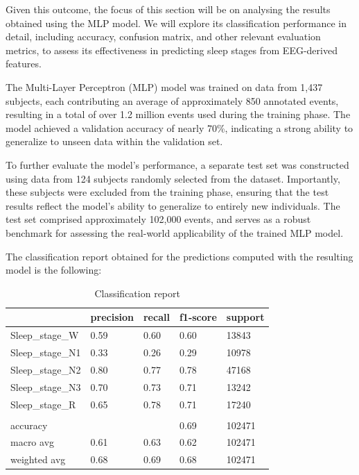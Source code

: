 Given this outcome, the focus of this section will be on analysing the results obtained using the MLP model. We will explore its classification performance in detail, including accuracy, confusion matrix, and other relevant evaluation metrics, to assess its effectiveness in predicting sleep stages from EEG-derived features.

The Multi-Layer Perceptron (MLP) model was trained on data from 1,437 subjects, each contributing an average of approximately 850 annotated events, resulting in a total of over 1.2 million events used during the training phase. The model achieved a validation accuracy of nearly 70\%, indicating a strong ability to generalize to unseen data within the validation set.

To further evaluate the model's performance, a separate test set was constructed using data from 124 subjects randomly selected from the dataset. Importantly, these subjects were excluded from the training phase, ensuring that the test results reflect the model's ability to generalize to entirely new individuals. The test set comprised approximately 102,000 events, and serves as a robust benchmark for assessing the real-world applicability of the trained MLP model.

The classification report obtained for the predictions computed with the resulting model is the following:

\begin{table}[H]
\begin{center}
\begin{tabular}{ |p{3cm}||p{2cm}||p{2cm}||p{2cm}||p{2cm}| }
 \hline
 & precision & recall & f1-score & support\\
 \hline  
 Sleep\_stage\_W & 0.59 & 0.60 & 0.60 & 13843 \\
 Sleep\_stage\_N1 & 0.33 & 0.26 & 0.29 & 10978 \\
 Sleep\_stage\_N2 & 0.80 & 0.77 & 0.78 & 47168 \\
 Sleep\_stage\_N3 & 0.70 & 0.73 & 0.71 & 13242 \\
 Sleep\_stage\_R & 0.65 & 0.78 & 0.71 & 17240 \\
 & & & & \\
 accuracy &  &  & 0.69 & 102471 \\
 macro avg & 0.61 & 0.63 & 0.62 & 102471 \\
 weighted avg & 0.68 & 0.69 & 0.68 & 102471 \\
 \hline
\end{tabular}
\end{center}
\caption{Classification report}
\label{tab4}
\end{table}

